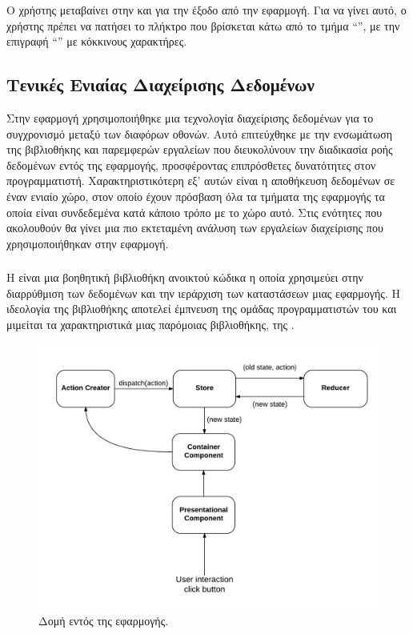 \newline
\indent
Ο χρήστης μεταβαίνει στην  και για την έξοδο από την εφαρμογή. Για να γίνει αυτό, ο χρήστης πρέπει να πατήσει το πλήκτρο που βρίσκεται κάτω από το τμήμα ``'', με την επιγραφή ``'' με κόκκινους χαρακτήρες.

\subsection{Τενικές Ενιαίας Διαχείρισης Δεδομένων}
Στην εφαρμογή χρησιμοποιήθηκε μια τεχνολογία διαχείρισης δεδομένων για το συγχρονισμό μεταξύ των διαφόρων οθονών. Αυτό επιτεύχθηκε με την ενσωμάτωση της βιβλιοθήκης  και παρεμφερών εργαλείων που διευκολύνουν την διαδικασία ροής δεδομένων εντός της εφαρμογής, προσφέροντας επιπρόσθετες δυνατότητες στον προγραμματιστή. Χαρακτηριστικότερη εξ' αυτών είναι η αποθήκευση δεδομένων σε έναν ενιαίο χώρο, στον οποίο έχουν πρόσβαση όλα τα τμήματα της εφαρμογής τα οποία είναι συνδεδεμένα κατά κάποιο τρόπο με το χώρο αυτό. Στις ενότητες που ακολουθούν θα γίνει μια πιο εκτεταμένη ανάλυση των εργαλείων διαχείρισης που χρησιμοποιήθηκαν στην εφαρμογή.


\subsubsection{}
Η  είναι μια βοηθητική βιβλιοθήκη ανοικτού κώδικα η οποία χρησιμεύει στην διαρρύθμιση των δεδομένων και την ιεράρχιση των καταστάσεων μιας εφαρμογής. Η ιδεολογία της βιβλιοθήκης αποτελεί έμπνευση της ομάδας προγραμματιστών του  και μιμείται τα χαρακτηριστικά μιας παρόμοιας βιβλιοθήκης, της . 

\begin{figure}
    \centering
    \includegraphics[scale=0.7]{figures/react-redux.png}
    \caption{Δομή  εντός της εφαρμογής.}
    \label{redux}
\end{figure}


